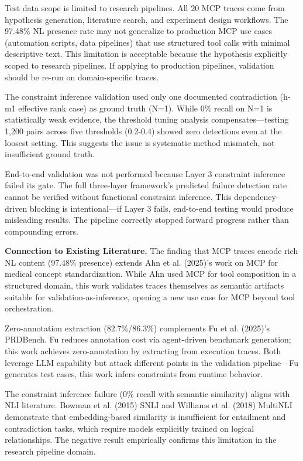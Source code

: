Test data scope is limited to research pipelines. All 20 MCP traces come from hypothesis generation, literature search, and experiment design workflows. The 97.48\% NL presence rate may not generalize to production MCP use cases (automation scripts, data pipelines) that use structured tool calls with minimal descriptive text. This limitation is acceptable because the hypothesis explicitly scoped to research pipelines. If applying to production pipelines, validation should be re-run on domain-specific traces.

The constraint inference validation used only one documented contradiction (h-m1 effective rank case) as ground truth (N=1). While 0\% recall on N=1 is statistically weak evidence, the threshold tuning analysis compensates---testing 1,200 pairs across five thresholds (0.2-0.4) showed zero detections even at the loosest setting. This suggests the issue is systematic method mismatch, not insufficient ground truth.

End-to-end validation was not performed because Layer 3 constraint inference failed its gate. The full three-layer framework's predicted failure detection rate cannot be verified without functional constraint inference. This dependency-driven blocking is intentional---if Layer 3 fails, end-to-end testing would produce misleading results. The pipeline correctly stopped forward progress rather than compounding errors.

\textbf{Connection to Existing Literature.} The finding that MCP traces encode rich NL content (97.48\% presence) extends Ahn et al. (2025)'s work on MCP for medical concept standardization. While Ahn used MCP for tool composition in a structured domain, this work validates traces themselves as semantic artifacts suitable for validation-as-inference, opening a new use case for MCP beyond tool orchestration.

Zero-annotation extraction (82.7\%/86.3\%) complements Fu et al. (2025)'s PRDBench. Fu reduces annotation cost via agent-driven benchmark generation; this work achieves zero-annotation by extracting from execution traces. Both leverage LLM capability but attack different points in the validation pipeline---Fu generates test cases, this work infers constraints from runtime behavior.

The constraint inference failure (0\% recall with semantic similarity) aligns with NLI literature. Bowman et al. (2015) SNLI and Williams et al. (2018) MultiNLI demonstrate that embedding-based similarity is insufficient for entailment and contradiction tasks, which require models explicitly trained on logical relationships. The negative result empirically confirms this limitation in the research pipeline domain.

